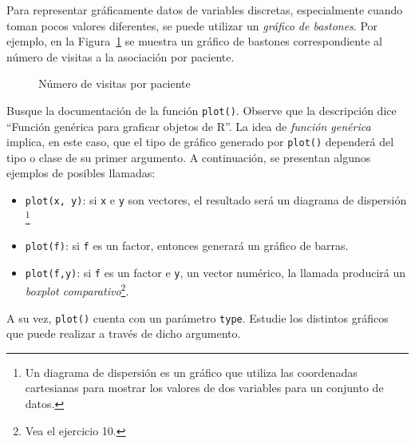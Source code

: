 \documentclass{prob}
\begin{document}
	\begin{problema}
	Para representar gráficamente datos de variables discretas, especialmente cuando toman pocos valores diferentes, se puede utilizar un \textit{gráfico de bastones}. Por ejemplo, en la Figura~\ref{fig:bast} se muestra un gráfico de bastones correspondiente al número de visitas a la asociación por paciente. 

\begin{figure}[!ht]
    \centering
    
    \caption{Número de visitas por paciente}
    \label{fig:bast}
\end{figure}		
	
	\begin{parte}
	Busque la documentación de la función \texttt{plot()}. Observe que la descripción dice \textquotedblleft Función genérica para graficar objetos de R\textquotedblright . La idea de \textit{función genérica} implica, en este caso, que el tipo de gráfico generado por \texttt{plot()} dependerá del tipo o clase de su primer argumento. A continuación, se presentan algunos ejemplos de posibles llamadas:
	\begin{itemize}
	\item \texttt{plot(x, y)}: si \texttt{x} e \texttt{y} son vectores, el resultado será un diagrama de dispersión \footnote{Un diagrama de dispersión es un gráfico que utiliza las coordenadas cartesianas para mostrar los valores de dos variables para un conjunto de datos.}
	\item \texttt{plot(f)}: si \texttt{f} es un factor, entonces generará un gráfico de barras.
	\item \texttt{plot(f,y)}: si \texttt{f} es un factor e \texttt{y}, un vector numérico, la llamada producirá un \textit{boxplot comparativo}\footnote{Vea el ejercicio 10.}.
	\end{itemize}		
	A su vez, \texttt{plot()} cuenta con un parámetro \texttt{type}. Estudie los distintos gráficos que puede realizar a través de dicho argumento.
	\end{parte}
	

\end{problema}
\end{document}
